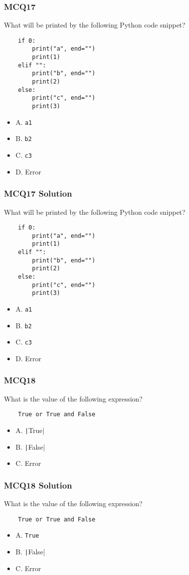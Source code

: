 \documentclass{beamer}
\newcommand{\python}[1]{\texttt|#1|}
\begin{document}
\begin{frame}[fragile]
    \frametitle{MCQ17}
    What will be printed by the following Python code snippet?
    \begin{verbatim}
    if 0:
        print("a", end="")
        print(1)
    elif "":
        print("b", end="")
        print(2)
    else:
        print("c", end="")
        print(3)
    \end{verbatim}
    \begin{itemize}
        \item A. \texttt{a1}
        \item B. \texttt{b2}
        \item C. \texttt{c3}
        \item D. Error
    \end{itemize}
\end{frame}
\begin{frame}[fragile]
    \frametitle{MCQ17 Solution}
    What will be printed by the following Python code snippet?
    \begin{verbatim}
    if 0:
        print("a", end="")
        print(1)
    elif "":
        print("b", end="")
        print(2)
    else:
        print("c", end="")
        print(3)
    \end{verbatim}
    \begin{itemize}
        \item A. \texttt{a1}
        \item B. \texttt{b2}
        \item \alert{C. \texttt{c3}}
        \item D. Error
    \end{itemize}
\end{frame}

\begin{frame}[fragile]
    \frametitle{MCQ18}
    What is the value of the following expression?
    \begin{verbatim}
    True or True and False
    \end{verbatim}
    \begin{itemize}
        \item A. \python{True}
        \item B. \python{False}
        \item C. Error
    \end{itemize}
\end{frame}
\begin{frame}[fragile]
    \frametitle{MCQ18 Solution}
    What is the value of the following expression?
    \begin{verbatim}
    True or True and False
    \end{verbatim}
    \begin{itemize}
        \item \alert{A. \texttt{True}}
        \item B. \python{False}
        \item C. Error
    \end{itemize}
\end{frame}
\end{document}
